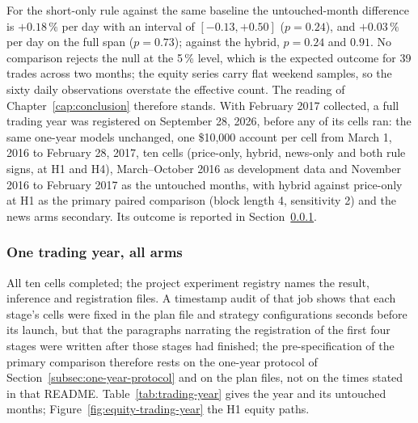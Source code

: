 For the short-only rule against the same baseline the untouched-month difference is $+0.18\,\%$ per day with an interval of $[-0.13, +0.50]$ ($p = 0.24$), and $+0.03\,\%$ per day on the full span ($p = 0.73$); against the hybrid, $p = 0.24$ and $0.91$. No comparison rejects the null at the 5\,\% level, which is the expected outcome for 39 trades across two months; the equity series carry flat weekend samples, so the sixty daily observations overstate the effective count. The reading of Chapter~\ref{cap:conclusion} therefore stands. With February 2017 collected, a full trading year was registered on September 28, 2026, before any of its cells ran: the same one-year models unchanged, one \$10,000 account per cell from March 1, 2016 to February 28, 2017, ten cells (price-only, hybrid, news-only and both rule signs, at H1 and H4), March--October 2016 as development data and November 2016 to February 2017 as the untouched months, with hybrid against price-only at H1 as the primary paired comparison (block length 4, sensitivity 2) and the news arms secondary. Its outcome is reported in Section~\ref{subsec:trading-year}.

\subsubsection{One trading year, all arms} \label{subsec:trading-year}

All ten cells completed; the project experiment registry names the result, inference and registration files. A timestamp audit of that job shows that each stage's cells were fixed in the plan file and strategy configurations seconds before its launch, but that the paragraphs narrating the registration of the first four stages were written after those stages had finished; the pre-specification of the primary comparison therefore rests on the one-year protocol of Section~\ref{subsec:one-year-protocol} and on the plan files, not on the times stated in that README. Table~\ref{tab:trading-year} gives the year and its untouched months; Figure~\ref{fig:equity-trading-year} the H1 equity paths.

